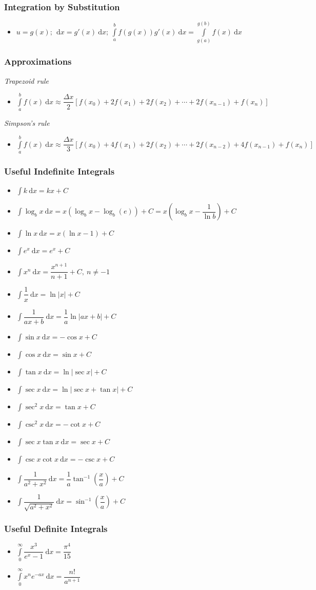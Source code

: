 \documentclass[]{report}
\newcommand \tab[1][1cm]{\hspace*{#1}}
\newcommand{\dn}[1]{\ \mathrm{d}#1}
\newcommand{\itemt}{\item \tab}
\begin{document}
\subsubsection{Integration by Substitution}
\begin{itemize}
\itemt \( u = g(x);\ \dn x = g'(x) \dn x;\ \int\limits_a^b f(g(x))g'(x) \dn x = \int\limits_{g(a)}^{g(b)} f(x) \dn x\)
\end{itemize}

\subsubsection{Approximations}
\textit{Trapezoid rule}
\begin{itemize}
\itemt \( \int\limits_a^b f(x) \dn x \approx \dfrac{\Delta x}{2} [f(x_0) + 2f(x_1) + 2f(x_2) + \cdots + 2f(x_{n-1}) + f(x_n)] \)
\end{itemize}
\textit{Simpson's rule}
\begin{itemize}
\itemt \( \int\limits_a^b f(x) \dn x \approx \dfrac{\Delta x}{3} [f(x_0) + 4f(x_1) + 2f(x_2) + \cdots + 2f(x_{n-2}) + 4f(x_{n-1}) + f(x_n)] \)
\end{itemize}

\subsubsection{Useful Indefinite Integrals}
\begin{itemize}
\itemt \( \int k \dn x = kx + C \)
\itemt \( \int \log_bx \dn x = x(\log_bx - \log_b(e)) + C = x(\log_bx - \dfrac{1}{\ln{b}}) + C \)
\itemt \( \int \ln x \dn x = x(\ln x-1) + C \)
\itemt \( \int e^x \dn x = e^x + C \)
\itemt \( \int x^n \dn x = \dfrac{x^{n+1}}{n+1} + C,\ n \neq -1 \)
\itemt \( \int \dfrac{1}{x} \dn x = \ln |x| + C \)
\itemt \( \int \dfrac{1}{ax+b} \dn x = \dfrac{1}{a}\ln |ax+b| + C \)
\itemt \( \int \sin x \dn x = -\cos x + C \)
\itemt \( \int \cos x \dn x = \sin x + C \)
\itemt \( \int \tan x \dn x = \ln |\sec x| + C \)
\itemt \( \int \sec x \dn x = \ln |\sec x + \tan x| + C \)
\itemt \( \int \sec^2 x \dn x = \tan x + C \)
\itemt \( \int \csc^2 x \dn x = -\cot x + C \)
\itemt \( \int \sec x \tan x \dn x = \sec x + C \)
\itemt \( \int \csc x \cot x \dn x = -\csc x + C \)
\itemt \( \int \dfrac{1}{a^2 + x^2} \dn x = \dfrac{1}{a} \tan^{-1}(\dfrac{x}{a}) +C \)
\itemt \( \int \dfrac{1}{\sqrt{a^2 + x^2}} \dn x = \sin^{-1}(\dfrac{x}{a}) +C \)
\end{itemize}

\subsubsection{Useful Definite Integrals}
\begin{itemize}
\itemt \( \int\limits^\infty_0 \dfrac{x^3}{e^x -1} \dn x = \dfrac{\pi^4}{15} \)
\itemt \( \int\limits^\infty_0 x^n e^{-ax} \dn x = \dfrac{n!}{a^{n+1}} \)
\end{itemize}
\end{document}
